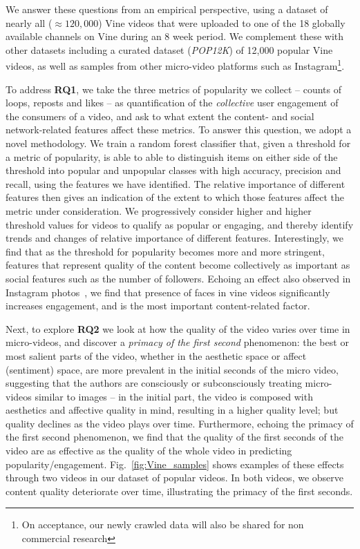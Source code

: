 We answer these questions from an empirical perspective, using a dataset of nearly all ($\approx 120,000$) Vine videos that were uploaded to one of the 18 globally available channels on Vine during an 8 week period. We complement these with other datasets including a curated dataset (\emph{POP12K}) of 12,000 popular Vine videos, as well as samples from other micro-video platforms such as Instagram\footnote{On acceptance, our newly crawled data will also be shared  for non commercial research}. 

To address \textbf{RQ1}, we take the three metrics of popularity we collect -- counts of loops, reposts and likes -- as quantification of the \emph{collective} user engagement of the consumers of a video, and ask to what extent the content- and social network-related features affect these metrics. To answer this question, we adopt a novel methodology.
We train a random forest classifier that, given a threshold for a metric of popularity, is able to able to distinguish items on either side of the threshold into popular and unpopular classes  with high accuracy, precision and recall, using the features we have identified. The relative importance of different features then gives an indication of the extent to which those features affect the metric under consideration. We progressively consider higher and higher threshold values for videos to qualify as popular or engaging, and thereby identify trends and changes of relative importance of different features. Interestingly, we find that as the threshold for popularity becomes more and more stringent, features that represent quality of the content become collectively as important as social features such as the number of followers. Echoing an effect also observed in Instagram photos~\cite{bakhshi2014faces}, we find that presence of faces in vine videos significantly increases engagement, and is the most important content-related factor.

Next, to explore \textbf{RQ2} we look at how the quality of the video varies over time in micro-videos, and discover a \emph{primacy of the first second} phenomenon: the best or most salient parts of the video, whether in the aesthetic space or affect (sentiment) space, are more prevalent in the initial seconds of the micro video, suggesting that the authors are consciously or subconsciously treating micro-videos similar to images -- in the initial part, the video is composed with aesthetics and affective quality in mind, resulting in a higher quality level; but quality declines as the video plays over time. Furthermore, echoing the primacy of the first second phenomenon, we find that the quality of the first seconds of the video are as effective as the quality of the whole video in predicting popularity/engagement. Fig.~\ref{fig:Vine_samples} shows examples of these effects through two videos in our dataset of popular videos. In both videos, we observe content quality deteriorate over time, illustrating the primacy of the first seconds. 

